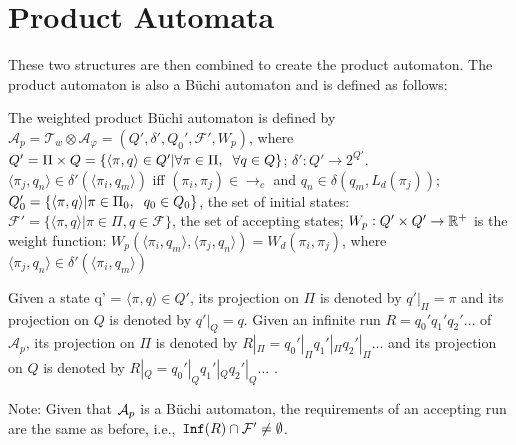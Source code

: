 \section{Product Automata}
These two structures are then combined to create the product automaton. The product automaton is also a B\"{u}chi automaton and is defined as follows:
\begin{definition}
The weighted product B\"{u}chi automaton is defined by $\mathcal{A}_p = \mathcal{T}_w \otimes \mathcal{A}_\varphi = (Q', \delta', Q_0', \mathcal{F}', W_p)$, where $Q' = \Pi \times Q = \{ \langle \pi, q \rangle \in Q' | \forall \pi \in \Pi, \hspace{0.2cm} \forall q \in Q \}$; $\delta': Q' \rightarrow 2^{Q'}$. $\langle \pi_j, q_n \rangle \in \delta' (\langle \pi_i, q_m \rangle )$ iff $(\pi_i , \pi_j ) \in \rightarrow_c$ and $q_n \in \delta (q_m, L_d(\pi_j))$; $Q_0' = \{ \langle \pi , q \rangle | \pi \in \Pi_0, \hspace{0.2cm} q_0 \in Q_0\}$, the set of initial states: $\mathcal{F}' = \{ \langle \pi, q \rangle | \pi \in \Pi, q \in \mathcal{F}\}$, the set of accepting states; $W_p: Q' \times Q' \rightarrow \mathbb{R}^+$ is the weight function: $W_p(\langle \pi_i, q_m \rangle , \langle \pi_j, q_n \rangle ) = W_d (\pi_i, \pi_j)$, where $\langle \pi_j, q_n \rangle \in \delta' ( \langle \pi_i, q_m \rangle )$
\end{definition} 

Given a state q' = $\langle \pi, q \rangle \in Q'$, its projection on $\Pi$ is denoted by $q'|_\Pi = \pi$ and its projection on $Q$ is denoted by $q'|_Q = q$. Given an infinite run $R = q_0' q_1' q_2' \dots$ of $\mathcal{A}_p$, its projection on $\Pi$ is denoted by $R|_\Pi = q_0'|_\Pi q_1'|_\Pi q_2'|_\Pi \dots$ and its projection on $Q$ is denoted by $R|_Q  = q_0'|_Q q_1'|_Q q_2'|_Q \dots$ \cite{guo15}. 

Note: Given that $\mathcal{A}_p$ is a B\"{u}chi automaton, the requirements of an accepting run are the same as before, i.e.,\ $\texttt{Inf}(R) \cap \mathcal{F}' \neq \emptyset$.

%
%


